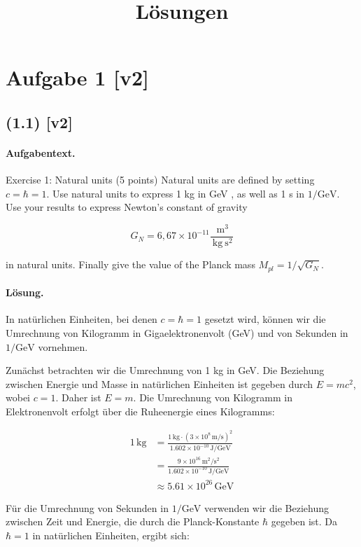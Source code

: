 \documentclass[11pt,a4paper]{article}
\title{Lösungen}
\date{}
\begin{document}
\maketitle

\section*{Aufgabe 1 [v2]}
\subsection*{(1.1) [v2]}
\paragraph{Aufgabentext.}
Exercise 1: Natural units (5 points)
Natural units are defined by setting $c=\hbar=1$.
Use natural units to express 1 kg in GeV , as well as 1 s in $1 / \mathrm{GeV}$. Use your results to express Newton's constant of gravity

$$
G_N=6,67 \times 10^{-11} \frac{\mathrm{~m}^3}{\mathrm{~kg} \mathrm{~s}^2}
$$

in natural units.
Finally give the value of the Planck mass $M_{p l}=1 / \sqrt{G_N}$.

\paragraph{Lösung.}
In natürlichen Einheiten, bei denen $c = \hbar = 1$ gesetzt wird, können wir die Umrechnung von Kilogramm in Gigaelektronenvolt (GeV) und von Sekunden in $1/\mathrm{GeV}$ vornehmen. 

Zunächst betrachten wir die Umrechnung von 1 kg in GeV. Die Beziehung zwischen Energie und Masse in natürlichen Einheiten ist gegeben durch $E = mc^2$, wobei $c = 1$. Daher ist $E = m$. Die Umrechnung von Kilogramm in Elektronenvolt erfolgt über die Ruheenergie eines Kilogramms:

\begin{align*}
1 \, \text{kg} &= \frac{1 \, \text{kg} \cdot (3 \times 10^8 \, \text{m/s})^2}{1.602 \times 10^{-10} \, \text{J/GeV}} \\
&= \frac{9 \times 10^{16} \, \text{m}^2/\text{s}^2}{1.602 \times 10^{-10} \, \text{J/GeV}} \\
&\approx 5.61 \times 10^{26} \, \text{GeV}
\end{align*}

Für die Umrechnung von Sekunden in $1/\mathrm{GeV}$ verwenden wir die Beziehung zwischen Zeit und Energie, die durch die Planck-Konstante $\hbar$ gegeben ist. Da $\hbar = 1$ in natürlichen Einheiten, ergibt sich:
\end{document}
